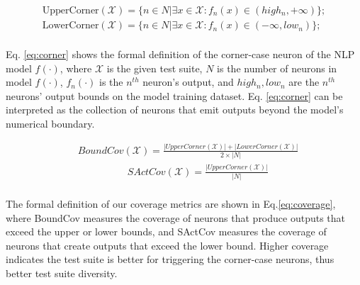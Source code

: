 \begin{equation}
\begin{split}
    \text{UpperCorner}(\mathcal{X}) = \{n \in N | \exists x \in \mathcal{X}: f_n(x) \in (high_n, +\infty)\}; \\
    \text{LowerCorner}(\mathcal{X}) = \{n \in N | \exists x \in \mathcal{X}: f_n(x) \in (-\infty, low_n)\}; \\
\end{split}
    \label{eq:corner}
\end{equation}

\noindent Eq. \ref{eq:corner} shows the formal definition of the corner-case neuron of the NLP model $f(\cdot)$, where $\mathcal{X}$ is the given test suite, $N$ is the number of neurons in model $f(\cdot)$, $f_n(\cdot)$ is the $n^{th}$ neuron's output, and $high_n, low_n$ are the $n^{th}$ neurons' output bounds on the model training dataset.
Eq. \ref{eq:corner} can be interpreted as the collection of neurons that emit outputs beyond the model's numerical boundary.

\begin{equation}
\begin{split}
     & BoundCov(\mathcal{X}) = \frac{|UpperCorner(\mathcal{X})| + |LowerCorner(\mathcal{X})| }{2 \times |N|} \\ 
     &\quad  \qquad \qquad  SActCov(\mathcal{X}) = \frac{|UpperCorner(\mathcal{X})|} {|N|} \\ 
\end{split}
    \label{eq:coverage}
\end{equation}

\noindent The formal definition of our coverage metrics are shown in Eq.\ref{eq:coverage}, where BoundCov measures the coverage of neurons that produce outputs that exceed the upper or lower bounds, and SActCov measures the coverage of neurons that create outputs that exceed the lower bound.
Higher coverage indicates the test suite is better for triggering the corner-case neurons, thus better test suite diversity.





